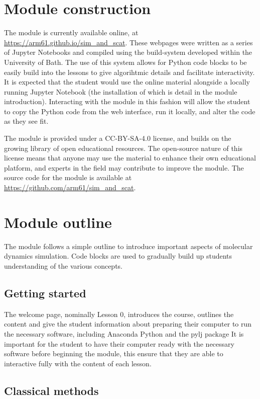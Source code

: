 \documentclass[amsmath,amssymb,twocolumn,superscriptaddress,aps,prl]{revtex4-1}
\begin{document}
\section{Module construction}

The module is currently available online, at \url{https://arm61.github.io/sim_and_scat}.
These webpages were written as a series of Jupyter Notebooks and compiled using the build-system developed within the University of Bath.
The use of this system allows for Python code blocks to be easily build into the lessons to give algorihtmic details and facilitate interactivity.
It is expected that the student would use the online material alongside a locally running Jupyter Notebook (the installation of which is detail in the module introduction).
Interacting with the module in this fashion will allow the student to copy the Python code from the web interface, run it locally, and alter the code as they see fit.

The module is provided under a CC-BY-SA-4.0 license, and builds on the growing library of open educational resources.
The open-source nature of this license means that anyone may use the material to enhance their own educational platform, and experts in the field may contribute to improve the module.
The source code for the module is available at \url{https://github.com/arm61/sim_and_scat}.

\section{Module outline}

The module follows a simple outline to introduce important aspects of molecular dynamics simulation.
Code blocks are used to gradually build up students understanding of the various concepts.

\subsection{Getting started}

The welcome page, nominally Lesson 0, introduces the course, outlines the content and give the student information about preparing their computer to run the necessary software, including Anaconda Python and the pylj package \cite{McCluskey2018}
It is important for the student to have their computer ready with the necessary software before beginning the module, this ensure that they are able to interactive fully with the content of each lesson.

\subsection{Classical methods}
\end{document}
